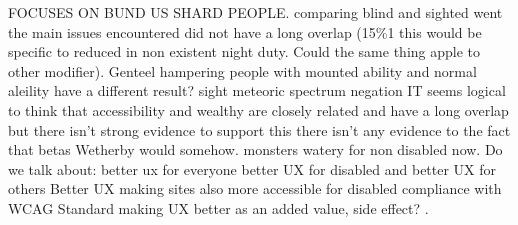 \documentclass{thesis_proposal}
\begin{document}
\pagebreak
FOCUSES ON BUND US SHARD PEOPLE.
comparing blind and sighted went the main issues encountered did not have a long overlap (15\%1 this would be specific to reduced in non existent night duty. Could the same thing apple to other modifier).
Genteel hampering people with mounted ability and normal aleility have a different result?
sight
meteoric spectrum negation
IT seems logical to think that accessibility and wealthy are closely related and have a long overlap but there isn't strong evidence to support this there isn't any evidence to the fact that betas Wetherby would somehow. monsters watery for non disabled now.
Do we talk about:
better ux for everyone
better UX for disabled and better UX for others
Better UX making sites also more accessible for disabled
compliance with WCAG Standard making UX better as an added value, side effect?
\citep{WHO_disability_2021}.





\pagebreak
\printbibliography{}
\end{document}
